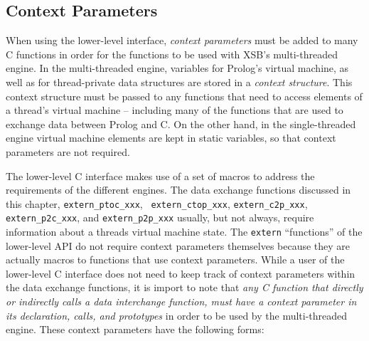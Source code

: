 \subsection{Context Parameters}

When using the lower-level interface, {\em context parameters} must be
added to many C functions in order for the functions to be used with
XSB's multi-threaded engine.  In the multi-threaded engine, variables
for Prolog's virtual machine, as well as for thread-private data
structures are stored in a {\em context structure}.  This context
structure must be passed to any functions that need to access elements
of a thread's virtual machine -- including many of the functions that
are used to exchange data between Prolog and C.  On the other hand, in
the single-threaded engine virtual machine elements are kept in static
variables, so that context parameters are not required.

The lower-level C interface makes use of a set of macros to address
the requirements of the different engines.  The data exchange
functions discussed in this chapter, {\tt extern\_ptoc\_xxx}, {\tt
  extern\_ctop\_xxx}, {\tt extern\_c2p\_xxx}, {\tt extern\_p2c\_xxx},
and {\tt extern\_p2p\_xxx} usually, but not always, require
information about a threads virtual machine state.  The {\tt extern}
``functions'' of the lower-level API do not require context parameters
themselves because they are actually macros to functions that use
context parameters.  While a user of the lower-level C interface does
not need to keep track of context parameters within the data exchange
functions, it is import to note that {\em any C function that directly
  or indirectly calls a data interchange function, must have a context
  parameter in its declaration, calls, and prototypes} in order to be
used by the multi-threaded engine.  These context parameters have the
following forms:


